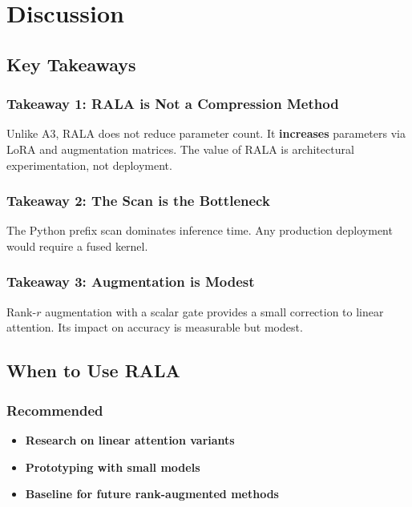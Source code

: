 
\section{Discussion}

\subsection{Key Takeaways}

\subsubsection{Takeaway 1: RALA is Not a Compression Method}

Unlike A3, RALA does not reduce parameter count. It \textbf{increases} parameters 
via LoRA and augmentation matrices. The value of RALA is architectural 
experimentation, not deployment.

\subsubsection{Takeaway 2: The Scan is the Bottleneck}

The Python prefix scan dominates inference time. Any production deployment 
would require a fused kernel.

\subsubsection{Takeaway 3: Augmentation is Modest}

Rank-$r$ augmentation with a scalar gate provides a small correction to linear 
attention. Its impact on accuracy is measurable but modest.

\subsection{When to Use RALA}

\subsubsection{Recommended}

\begin{itemize}
\item \textbf{Research on linear attention variants}
\item \textbf{Prototyping with small models}
\item \textbf{Baseline for future rank-augmented methods}

\end{itemize}
